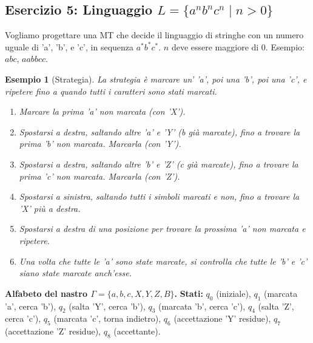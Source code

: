\documentclass[a4paper]{article}
\newtheorem{example}{Esempio}
\begin{document}
\subsection{Esercizio 5: Linguaggio $L = \{a^n b^n c^n \mid n > 0\}$}

Vogliamo progettare una MT che decide il linguaggio di stringhe con un numero uguale di 'a', 'b', e 'c', in sequenza $a^*b^*c^*$. $n$ deve essere maggiore di $0$. Esempio: $abc$, $aabbcc$.

\begin{example}[Strategia]
La strategia è marcare un' 'a', poi una 'b', poi una 'c', e ripetere fino a quando tutti i caratteri sono stati marcati.
\begin{enumerate}
    \item Marcare la prima 'a' non marcata (con 'X').
    \item Spostarsi a destra, saltando altre 'a' e 'Y' (b già marcate), fino a trovare la prima 'b' non marcata. Marcarla (con 'Y').
    \item Spostarsi a destra, saltando altre 'b' e 'Z' (c già marcate), fino a trovare la prima 'c' non marcata. Marcarla (con 'Z').
    \item Spostarsi a sinistra, saltando tutti i simboli marcati e non, fino a trovare la 'X' più a destra.
    \item Spostarsi a destra di una posizione per trovare la prossima 'a' non marcata e ripetere.
    \item Una volta che tutte le 'a' sono state marcate, si controlla che tutte le 'b' e 'c' siano state marcate anch'esse.
\end{enumerate}
\end{example}

\noindent \textbf{Alfabeto del nastro $\Gamma = \{a, b, c, X, Y, Z, B\}$.}
\noindent \textbf{Stati:} $q_0$ (iniziale), $q_1$ (marcata 'a', cerca 'b'), $q_2$ (salta 'Y', cerca 'b'), $q_3$ (marcata 'b', cerca 'c'), $q_4$ (salta 'Z', cerca 'c'), $q_5$ (marcata 'c', torna indietro), $q_6$ (accettazione 'Y' residue), $q_7$ (accettazione 'Z' residue), $q_8$ (accettante).
\end{document}
